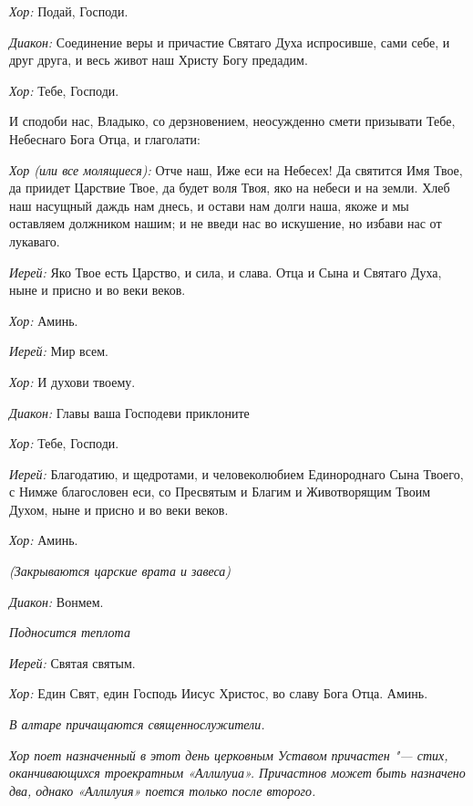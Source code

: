 \begin{mymulticols}
{\itshape Хор:} Подай, Господи.

{\itshape Диакон:} Соединение веры и причастие Святаго Духа испросивше, сами себе, и друг друга, и весь живот наш Христу Богу предадим. 

{\itshape Хор:} Тебе, Господи. 

  И сподоби нас, Владыко, со дерзновением, неосужденно смети призывати Тебе, Небеснаго Бога Отца, и глаголати: 



 {\itshape Хор (или все молящиеся):} Отче наш, Иже еси на Небесех! Да святится Имя Твое, да приидет Царствие Твое, да будет воля Твоя, яко на небеси и на земли. Хлеб наш насущный даждь нам днесь, и остави нам долги наша, якоже и мы оставляем должником нашим; и не введи нас во искушение, но избави нас от лукаваго. 


 {\itshape Иерей:} Яко Твое есть Царство, и сила, и слава. Отца и Сына и Святаго Духа, ныне и присно и во веки веков. 

{\itshape Хор:} Аминь. 

{\itshape Иерей:} Мир всем. 

{\itshape Хор:} И духови твоему.
  
{\itshape Диакон:} Главы ваша Господеви приклоните

{\itshape Хор:} Тебе, Господи.

{\itshape Иерей:} Благодатию, и щедротами, и человеколюбием Единороднаго Сына Твоего, с Нимже благословен еси, со Пресвятым и Благим и Животворящим Твоим Духом, ныне и присно и во веки веков. 

{\itshape Хор:} Аминь.

{\itshape (Закрываются царские врата и завеса)}

{\itshape Диакон:} Вонмем. 

{\itshape Подносится теплота}

{\itshape Иерей:} Святая святым. 


 {\itshape Хор:} Един Свят, един Господь Иисус Христос, во славу Бога Отца. Аминь. 




{\itshape В алтаре причащаются священнослужители. }


{\itshape Хор поет назначенный в этот день церковным Уставом причастен "--- стих, оканчивающихся троекратным «Аллилуиа». Причастнов может быть назначено два, однако «Аллилуия» поется только после второго.}



\end{mymulticols}
